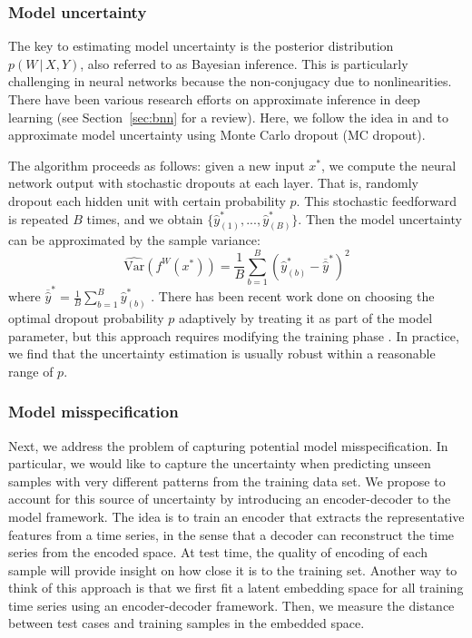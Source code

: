 \documentclass[conference,compsoc,final]{IEEEtran}
\begin{document}
\subsubsection{Model uncertainty}
The key to estimating model uncertainty is the posterior distribution $p(W\,|\, X, Y)$, also referred to as Bayesian inference. This is particularly challenging in neural networks because the non-conjugacy due to nonlinearities. There have been various research efforts on approximate inference in deep learning (see Section~\ref{sec:bnn} for a review). Here, we follow the idea in  \cite{gal2016dropout} and \cite{Gal2015Theoretically} to approximate model uncertainty using Monte Carlo dropout (MC dropout). 

The algorithm proceeds as follows: given a new input $x^*$, we compute the neural network output with stochastic dropouts at each layer. That is, randomly dropout each hidden unit with certain probability $p$. This stochastic feedforward is repeated $B$ times, and we obtain $\{\hat{y}^*_{(1)}, ..., \hat{y}^*_{(B)}\}$. Then the model uncertainty can be approximated by the sample variance: 
\begin{equation} 
\widehat{\textrm{Var}}(f^W(x^*)) = \frac{1}{B} \sum_{b=1}^B \left(\hat{y}^*_{(b)} - \overline{\hat{y}}^* \right)^2
\end{equation}
where $\overline{\hat{y}}^* = \frac{1}{B} \sum_{b=1}^B \hat{y}^*_{(b)}$ \cite{gal2016dropout}.
There has been recent work done on choosing the optimal dropout probability $p$ adaptively by treating it as part of the model parameter, but this approach requires modifying the training phase \cite{gal2017concrete}. In practice, we find that the uncertainty estimation is usually robust within a reasonable range of $p$. 


\subsubsection{Model misspecification}
Next, we address the problem of capturing potential model misspecification. In particular, we would like to capture the uncertainty when predicting unseen samples with very different patterns from the training data set. We propose to account for this source of uncertainty by introducing an encoder-decoder to the model framework. The idea is to train an encoder that extracts the representative features from a time series, in the sense that a decoder can reconstruct the time series from the encoded space. At test time, the quality of encoding of each sample will provide insight on how close it is to the training set. Another way to think of this approach is that we first fit a latent embedding space for all training time series using an encoder-decoder framework. Then, we measure the distance between test cases and training samples in the embedded space.
\end{document}
